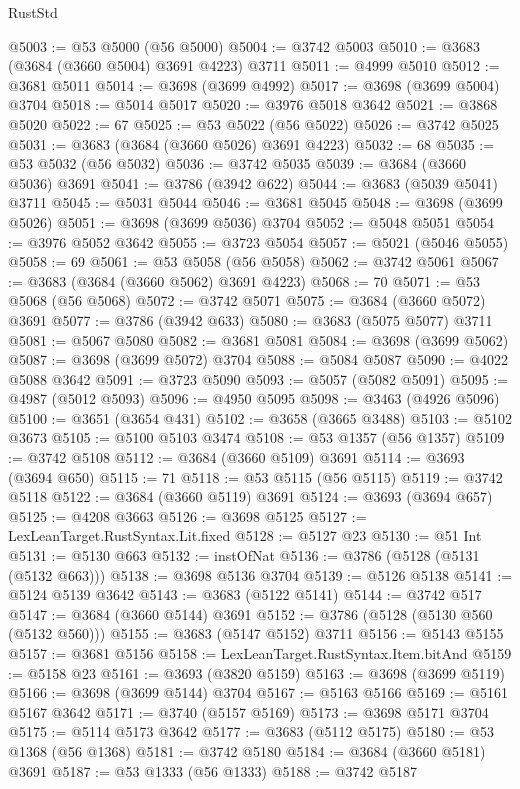 \begin{lexlean}{RustStd}
\begin{coremodule}
@5003 := @53 @5000 (@56 @5000)
@5004 := @3742 @5003
@5010 := @3683 (@3684 (@3660 @5004) @3691 @4223) @3711
@5011 := @4999 @5010
@5012 := @3681 @5011
@5014 := @3698 (@3699 @4992)
@5017 := @3698 (@3699 @5004) @3704
@5018 := @5014 @5017
@5020 := @3976 @5018 @3642
@5021 := @3868 @5020
@5022 := 67
@5025 := @53 @5022 (@56 @5022)
@5026 := @3742 @5025
@5031 := @3683 (@3684 (@3660 @5026) @3691 @4223)
@5032 := 68
@5035 := @53 @5032 (@56 @5032)
@5036 := @3742 @5035
@5039 := @3684 (@3660 @5036) @3691
@5041 := @3786 (@3942 @622)
@5044 := @3683 (@5039 @5041) @3711
@5045 := @5031 @5044
@5046 := @3681 @5045
@5048 := @3698 (@3699 @5026)
@5051 := @3698 (@3699 @5036) @3704
@5052 := @5048 @5051
@5054 := @3976 @5052 @3642
@5055 := @3723 @5054
@5057 := @5021 (@5046 @5055)
@5058 := 69
@5061 := @53 @5058 (@56 @5058)
@5062 := @3742 @5061
@5067 := @3683 (@3684 (@3660 @5062) @3691 @4223)
@5068 := 70
@5071 := @53 @5068 (@56 @5068)
@5072 := @3742 @5071
@5075 := @3684 (@3660 @5072) @3691
@5077 := @3786 (@3942 @633)
@5080 := @3683 (@5075 @5077) @3711
@5081 := @5067 @5080
@5082 := @3681 @5081
@5084 := @3698 (@3699 @5062)
@5087 := @3698 (@3699 @5072) @3704
@5088 := @5084 @5087
@5090 := @4022 @5088 @3642
@5091 := @3723 @5090
@5093 := @5057 (@5082 @5091)
@5095 := @4987 (@5012 @5093)
@5096 := @4950 @5095
@5098 := @3463 (@4926 @5096)
@5100 := @3651 (@3654 @431)
@5102 := @3658 (@3665 @3488)
@5103 := @5102 @3673
@5105 := @5100 @5103 @3474
@5108 := @53 @1357 (@56 @1357)
@5109 := @3742 @5108
@5112 := @3684 (@3660 @5109) @3691
@5114 := @3693 (@3694 @650)
@5115 := 71
@5118 := @53 @5115 (@56 @5115)
@5119 := @3742 @5118
@5122 := @3684 (@3660 @5119) @3691
@5124 := @3693 (@3694 @657)
@5125 := @4208 @3663
@5126 := @3698 @5125
@5127 := LexLeanTarget.RustSyntax.Lit.fixed
@5128 := @5127 @23
@5130 := @51 Int
@5131 := @5130 @663
@5132 := instOfNat
@5136 := @3786 (@5128 (@5131 (@5132 @663)))
@5138 := @3698 @5136 @3704
@5139 := @5126 @5138
@5141 := @5124 @5139 @3642
@5143 := @3683 (@5122 @5141)
@5144 := @3742 @517
@5147 := @3684 (@3660 @5144) @3691
@5152 := @3786 (@5128 (@5130 @560 (@5132 @560)))
@5155 := @3683 (@5147 @5152) @3711
@5156 := @5143 @5155
@5157 := @3681 @5156
@5158 := LexLeanTarget.RustSyntax.Item.bitAnd
@5159 := @5158 @23
@5161 := @3693 (@3820 @5159)
@5163 := @3698 (@3699 @5119)
@5166 := @3698 (@3699 @5144) @3704
@5167 := @5163 @5166
@5169 := @5161 @5167 @3642
@5171 := @3740 (@5157 @5169)
@5173 := @3698 @5171 @3704
@5175 := @5114 @5173 @3642
@5177 := @3683 (@5112 @5175)
@5180 := @53 @1368 (@56 @1368)
@5181 := @3742 @5180
@5184 := @3684 (@3660 @5181) @3691
@5187 := @53 @1333 (@56 @1333)
@5188 := @3742 @5187

\end{coremodule}
\end{lexlean}
